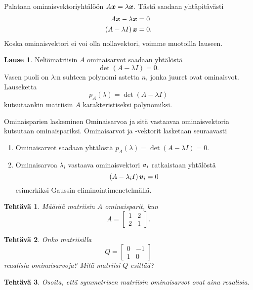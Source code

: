 \documentclass[a4paper, 12pt]{article}
\newcommand{\vek}[1]{\mbox{\boldmath$#1$}}
\renewcommand{\vec}[1]{\vek{#1}}
\theoremstyle{exercise}
\newtheorem{teht}{Tehtävä}
\theoremstyle{remark}
\theoremstyle{definition}
\newtheorem*{theorem}{Lause}
\begin{document}
Palataan ominaisvektoriyhtälöön $A\vec{x}=\lambda\vec{x}.$ Tästä saadaan yhtäpitävästi
\begin{align*}
A\vec{x}-\lambda\vec{x}&=0\\
\left(A-\lambda I\right)\vec{x}&=0.
\end{align*}
Koska ominaisvektori ei voi olla nollavektori, voimme muotoilla lauseen.

\begin{theorem} Neliömatriisin $A$ ominaisarvot saadaan yhtälöstä
$$\det\left(A-\lambda I\right)=0.$$
Vasen puoli on $\lambda$:n suhteen polynomi astetta $n$, jonka juuret ovat ominaisvot. Lauseketta
$$
p_A(\lambda)=\det\left(A-\lambda I\right)$$
kutsutaankin matriisin $A$ karakteristiseksi polynomiksi.
\end{theorem}

\begin{mybox}{Ominaisparien laskeminen}
Ominaisarvoa ja sitä vastaavaa ominaisvektoria kutsutaan ominaispariksi. Ominaisarvot ja -vektorit lasketaan seuraavasti
\begin{enumerate}
\item Ominaisarvot saadaan yhtälöstä $p_A(\lambda)=\det\left(A-\lambda I\right)=0.$
\item Ominaisarvoa $\lambda_i$ vastaava ominaisvektori $\vec{v}_i$ ratkaistaan yhtälöstä 
$$
\left(A-\lambda_i I\right)\vec{v}_i=0
$$
esimerkiksi Gaussin eliminointimenetelmällä.
\end{enumerate}
\end{mybox}
\begin{teht}
Määrää matriisin $A$ ominaisparit, kun
$$
A=\begin{bmatrix}
 	1 & 2\\
 	2 & 1
\end{bmatrix}.
$$
\end{teht}

\begin{teht}
Onko matriisilla 
$$
Q=\begin{bmatrix}
0 & -1 \\
1 & 0
\end{bmatrix}
$$ 
reaalisia ominaisarvoja? Mitä matriisi $Q$ esittää?
\end{teht}
\begin{teht} Osoita, että symmetrisen matriisin ominaisarvot ovat aina reaalisia.
\end{teht}
\end{document}
